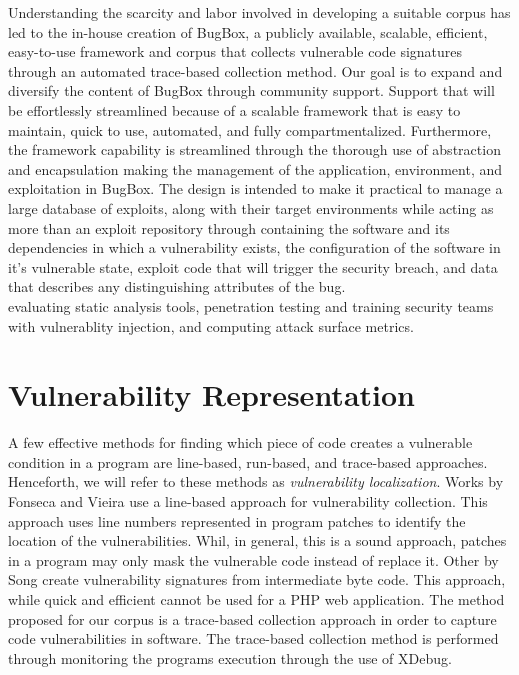 \documentclass[letterpaper,twocolumn,10pt]{article}
\begin{document}
Understanding the scarcity and labor involved in developing a suitable corpus has led to the in-house creation of BugBox, a publicly available, scalable, efficient, easy-to-use framework and corpus that collects vulnerable code signatures through an automated trace-based collection method.  Our goal is to expand and diversify the content of BugBox through community support.  Support that will be effortlessly streamlined because of a scalable framework that is easy to maintain, quick to use, automated, and fully compartmentalized.  Furthermore, the framework capability is streamlined through the thorough use of abstraction and encapsulation making the management of the application, environment, and exploitation in BugBox.  The design is intended to make it practical to manage a large database of exploits, along with their target environments while acting as more than an exploit repository through containing the software and its dependencies in which a vulnerability exists, the configuration of the software in it's vulnerable state, exploit code that will trigger the security breach, and data that describes any distinguishing attributes of the bug.\\

evaluating static analysis tools\cite{Zitser:2004:TSA:1041685.1029911}, penetration testing and training security teams with vulnerablity injection\cite{4725309}, and computing attack surface metrics.\cite{Stuckman:2012:CAA:2372225.2372229}\\

\section{Vulnerability Representation}

A few effective methods for finding which piece of code creates a vulnerable condition in a program are line-based, run-based, and trace-based approaches.  Henceforth, we will refer to these  methods as \emph{vulnerability localization}.  Works by Fonseca and Vieira\cite{4630094} use a line-based approach for vulnerability collection.  This approach uses line numbers represented in program patches to identify the location of the vulnerabilities.  Whil, in general, this is a sound approach, patches in a program may only mask the vulnerable code instead of replace it.  Other by Song\cite{Song:2008:BNA:1496255.1496257} create vulnerability signatures from intermediate byte code.  This approach, while quick and efficient cannot be used for a PHP web application.  The method proposed for our corpus is a trace-based collection approach in order to capture code vulnerabilities in software.  The trace-based collection method is performed through monitoring the programs execution through the use of XDebug.
\end{document}
